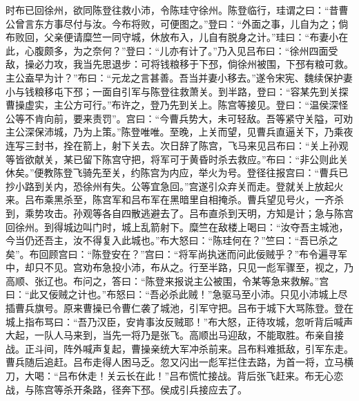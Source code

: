 时布已回徐州，欲同陈登往救小沛，令陈珪守徐州。陈登临行，珪谓之曰：“昔曹公曾言东方事尽付与汝。今布将败，可便图之。”登曰：“外面之事，儿自为之；倘布败回，父亲便请糜竺一同守城，休放布入，儿自有脱身之计。”珪曰：“布妻小在此，心腹颇多，为之奈何？”登曰：“儿亦有计了。”乃入见吕布曰：“徐州四面受敌，操必力攻，我当先思退步：可将钱粮移于下邳，倘徐州被围，下邳有粮可救。主公盍早为计？”布曰：“元龙之言甚善。吾当并妻小移去。”遂令宋宪、魏续保护妻小与钱粮移屯下邳；一面自引军与陈登往救萧关。到半路，登曰：“容某先到关探曹操虚实，主公方可行。”布许之，登乃先到关上。陈宫等接见。登曰：“温侯深怪公等不肯向前，要来责罚”。宫曰：“今曹兵势大，未可轻敌。吾等紧守关隘，可劝主公深保沛城，乃为上策。”陈登唯唯。至晚，上关而望，见曹兵直逼关下，乃乘夜连写三封书，拴在箭上，射下关去。次日辞了陈宫，飞马来见吕布曰：“关上孙观等皆欲献关，某已留下陈宫守把，将军可于黄昏时杀去救应。”布曰：“非公则此关休矣。”便教陈登飞骑先至关，约陈宫为内应，举火为号。登径往报宫曰：“曹兵已抄小路到关内，恐徐州有失。公等宜急回。”宫遂引众弃关而走。登就关上放起火来。吕布乘黑杀至，陈宫军和吕布军在黑暗里自相掩杀。曹兵望见号火，一齐杀到，乘势攻击。孙观等各自四散逃避去了。吕布直杀到天明，方知是计；急与陈宫回徐州。到得城边叫门时，城上乱箭射下。糜竺在敌楼上喝曰：“汝夺吾主城池，今当仍还吾主，汝不得复入此城也。”布大怒曰：“陈珪何在？”竺曰：“吾已杀之矣”。布回顾宫曰：“陈登安在？”宫曰：“将军尚执迷而问此佞贼乎？”布令遍寻军中，却只不见。宫劝布急投小沛，布从之。行至半路，只见一彪军骤至，视之，乃高顺、张辽也。布问之，答曰：“陈登来报说主公被围，令某等急来救解。”宫曰：“此又佞贼之计也。”布怒曰：“吾必杀此贼！”急驱马至小沛。只见小沛城上尽插曹兵旗号。原来曹操已令曹仁袭了城池，引军守把。吕布于城下大骂陈登。登在城上指布骂曰：“吾乃汉臣，安肯事汝反贼耶！”布大怒，正待攻城，忽听背后喊声大起，一队人马来到，当先一将乃是张飞。高顺出马迎敌，不能取胜。布亲自接战。正斗间，阵外喊声复起，曹操亲统大军冲杀前来。吕布料难抵敌，引军东走。曹兵随后追赶。吕布走得人困马乏。忽又闪出一彪军拦住去路，为首一将，立马横刀，大喝：“吕布休走！关云长在此！”吕布慌忙接战。背后张飞赶来。布无心恋战，与陈宫等杀开条路，径奔下邳。侯成引兵接应去了。

